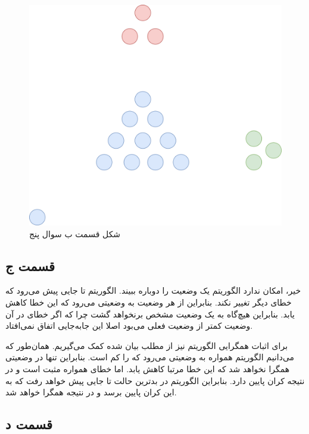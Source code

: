 \documentclass[12pt, a4paper]{article}
\begin{document}
\begin{figure}[h]
    \centering
    \includegraphics[scale=0.4]{images/q5/b/outliers.png}
    \caption{شکل قسمت ب سوال پنج}
    \label{q5b}
\end{figure}

\subsection*{قسمت ج}

خیر، امکان ندارد الگوریتم  یک وضعیت را دوباره ببیند. الگوریتم
 تا جایی پیش می‌رود که خطای  دیگر تغییر نکند. بنابراین از هر
وضعیت به وضعیتی می‌رود که این خطا کاهش یابد. بنابراین هیچ‌گاه
به یک وضعیت مشخص برنخواهد گشت چرا که اگر خطای  در آن وضعیت کمتر از
وضعیت فعلی می‌بود اصلا این جابه‌جایی اتفاق نمی‌افتاد.

برای اثبات همگرایی الگوریتم  نیز از مطلب بیان شده کمک می‌گیریم.
همان‌طور که می‌دانیم الگوریتم همواره به وضعیتی می‌رود که  را کم است.
بنابراین تنها در وضعیتی همگرا نخواهد شد که این خطا مرتبا کاهش یابد.
اما خطای  همواره مثبت است و در نتیجه کران پایین دارد. بنابراین الگوریتم
در بدترین حالت تا جایی پیش خواهد رفت که به این کران پایین برسد و در نتیجه همگرا
خواهد شد.

\subsection*{قسمت د}
\end{document}
